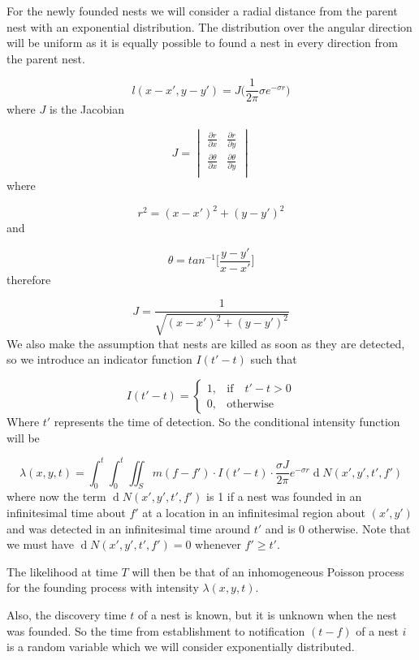 \documentclass[11pt,a4paper]{article}
\renewcommand{\d}[1]{\ensuremath{\operatorname{d}\!{#1}}}
\begin{document}
For the newly founded nests we will consider a radial distance from the parent nest with an exponential distribution. The distribution over the angular direction will be uniform as it is equally possible to found a nest in every direction from the parent nest.

\begin{equation}
l(x - x', y - y')= J \bigg(\frac{1}{2 \pi} \sigma e^{- \sigma r}\bigg)
\end{equation}
where $J$ is the Jacobian

\[
J =  
\begin{vmatrix}
	\frac{\partial r}{\partial x} & \frac{\partial r}{\partial y} \\
	\frac{\partial \theta}{\partial x} & \frac{\partial \theta}{\partial y} \\
\end{vmatrix}
\]
where

\[
r^{2} = (x - x')^{2} + (y - y')^{2}
\]
and

\[
\theta = tan^{-1} \Bigg [\frac{y - y'}{x - x'} \Bigg ]
\]
therefore

\[
J = \frac{1}{\sqrt{(x - x')^{2} + (y - y')^{2}}}
\]
We also make the assumption that nests are killed as soon as they are detected, so we introduce an indicator function $I(t' - t)$ such that

\[
I (t' - t) =
\begin{cases}
1, & \mbox{if} \quad t' -  t> 0 \\
0, & \mbox{otherwise}
\end{cases}
\]
Where $t'$ represents the time of detection. So the conditional intensity function will be

\[
\lambda(x, y, t) = \int_{0}^{t} \int_{0}^{t} \iint_{S} m(f - f') \cdot I(t' - t)\cdot \frac{\sigma J }{2 \pi} e^{- \sigma r} \d N(x',y',t',f')
\]
where now the term $\d N(x',y',t',f')$ is 1 if a nest was founded in an infinitesimal time about $f'$ at a location in an infinitesimal region about $(x', y')$ and was detected in an infinitesimal time around $t'$ and is $0$ otherwise. Note that we must have $\d N(x',y',t',f')=0$ whenever $f' \geq t'$.

The likelihood at time $T$ will then be that of  an inhomogeneous Poisson process for the founding process with intensity $\lambda(x, y, t)$.

Also, the discovery time $t$ of a nest is known, but it is unknown when the nest was founded. So the time from establishment to notification $(t - f)$ of a nest $i$ is a random variable which we will consider exponentially distributed.
\end{document}
